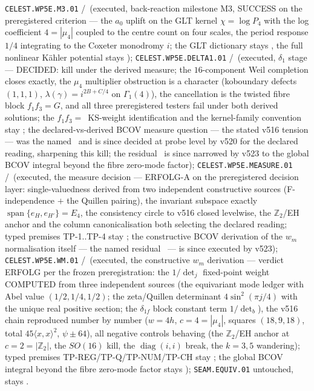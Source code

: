 \documentclass[11pt,a4paper]{article}
\newcommand{\Z}{\mathbb Z}
\begin{document}
\texttt{CELEST.WP5E.M3.01} \mE/\mC\ (executed, back-reaction milestone M3, SUCCESS on the
preregistered criterion --- the $a_0$ uplift on the GLT kernel $\chi=\log P_4$ with the log
coefficient $4=|\mu_4|$ coupled to the centre count on four scales, the period response $1/4$
integrating to the Coxeter monodromy $i$; the GLT dictionary stays \mC, the full nonlinear
K\"ahler potential stays \mO);
\texttt{CELEST.WP5E.DELTA1.01} \mE/\mC\ (executed, $\delta_1$ stage --- DECIDED: kill under
the derived measure; the $16$-component Weil completion closes exactly, the $\mu_4$ multiplier
obstruction is a character (koboundary defects $(1,1,1)$, $\lambda(\gamma)=i^{2B+C/4}$ on
$\Gamma_1(4)$), the cancellation is the twisted fibre block $f_1f_3=G$, and all three
preregistered testers fail under both derived solutions; the $f_1f_3=$~KS-weight
identification and the kernel-family convention stay \mC; the declared-vs-derived BCOV measure
question --- the stated v516 tension --- was the named \mO\ and is since decided at probe level
by v520 for the declared reading, sharpening this kill; the residual \mO\ is since narrowed
by v523 to the global BCOV integral beyond the fibre zero-mode factor);
\texttt{CELEST.WP5E.MEASURE.01} \mE/\mC\ (executed, the measure decision --- ERFOLG-A on the
preregistered decision layer: single-valuedness derived from two independent constructive
sources (F-independence $+$ the Quillen pairing), the invariant subspace exactly
$\operatorname{span}\{e_H,e_{H'}\}=E_4$, the consistency circle to v516 closed levelwise, the
$\Z_2$/EH anchor and the column canonicalisation both selecting the declared reading; typed
premises TP-1..TP-4 stay \mC; the constructive BCOV derivation of the $w_m$ normalisation
itself --- the named residual \mO\ --- is since executed by v523);
\texttt{CELEST.WP5E.WM.01} \mE/\mC\ (executed, the constructive $w_m$ derivation --- verdict
ERFOLG per the frozen preregistration: the $1/\det_j$ fixed-point weight COMPUTED from three
independent sources (the equivariant mode ledger with Abel value $(1/2,1/4,1/2)$; the
zeta/Quillen determinant $4\sin^2(\pi j/4)$ with the unique real positive section; the
$\delta_{1f}$ block constant term $1/\det_b$), the v516 chain reproduced number by number
($w=4h$, $c=4=|\mu_4|$, squares $(18,9,18)$, total $45\langle x,x\rangle^2$, $\psi\pm64$),
all negative controls behaving (the $\Z_2$/EH anchor at $c=2=|\Z_2|$, the $SO(16)$ kill, the
$\operatorname{diag}(i,i)$ break, the $k=3,5$ wandering); typed premises
TP-REG/TP-Q/TP-NUM/TP-CH stay \mC; the global BCOV integral beyond the fibre zero-mode factor
stays \mO);
\texttt{SEAM.EQUIV.01} untouched, stays \mO.
\end{document}
